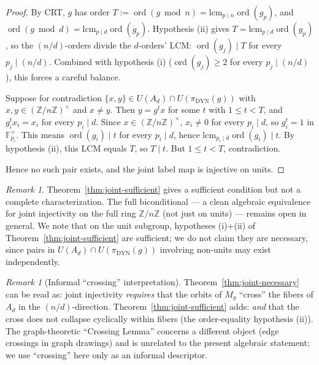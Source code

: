 \documentclass[11pt,reqno]{amsart}
\theoremstyle{plain}
\theoremstyle{definition}
\theoremstyle{remark}
\newtheorem{remark}[theorem]{Remark}
\DeclareMathOperator{\ord}{ord}
\DeclareMathOperator{\dyn}{DYN}
\newcommand{\Z}{\mathbb{Z}}
\newcommand{\F}{\mathbb{F}}
\begin{document}
\begin{proof}
By CRT, $g$ has order $T := \ord(g \bmod n) = \mathrm{lcm}_{p \mid n}
\ord(g_{p})$, and $\ord(g \bmod d) = \mathrm{lcm}_{p \mid d}
\ord(g_{p})$. Hypothesis (ii) gives $T = \mathrm{lcm}_{p \mid d}
\ord(g_{p})$, so the $(n/d)$-orders divide the $d$-orders' LCM:
$\ord(g_{j}) \mid T$ for every $p_{j} \mid (n/d)$. Combined with
hypothesis (i) ($\ord(g_{j}) \ge 2$ for every $p_{j} \mid (n/d)$),
this forces a careful balance.

Suppose for contradiction $\{x, y\} \in U(A_{d}) \cap U(\pi_{\dyn}(g))$
with $x, y \in (\Z/n\Z)^{\times}$ and $x \ne y$. Then $y = g^{t} x$
for some $t$ with $1 \le t < T$, and $g_{i}^{t} x_{i} = x_{i}$ for
every $p_{i} \mid d$. Since $x \in (\Z/n\Z)^{\times}$, $x_{i} \ne 0$
for every $p_{i} \mid d$, so $g_{i}^{t} = 1$ in $\F_{p_{i}}^{\times}$.
This means $\ord(g_{i}) \mid t$ for every $p_{i} \mid d$, hence
$\mathrm{lcm}_{p_{i} \mid d} \ord(g_{i}) \mid t$. By hypothesis (ii),
this LCM equals $T$, so $T \mid t$. But $1 \le t < T$, contradiction.

Hence no such pair exists, and the joint label map is injective on
units.
\end{proof}

\begin{remark}\label{rem:sufficient-not-equiv}
Theorem~\ref{thm:joint-sufficient} gives a sufficient condition but
not a complete characterization. The full biconditional --- a clean
algebraic equivalence for joint injectivity on the full ring
$\Z/n\Z$ (not just on units) --- remains open in general. We note
that on the unit subgroup, hypotheses (i)+(ii) of
Theorem~\ref{thm:joint-sufficient} are sufficient; we do not claim
they are necessary, since pairs in $U(A_{d}) \cap U(\pi_{\dyn}(g))$
involving non-units may exist independently.
\end{remark}

\begin{remark}[Informal ``crossing'' interpretation]\label{rem:crossing-informal}
Theorem~\ref{thm:joint-necessary} can be read as: joint injectivity
\emph{requires} that the orbits of $M_{g}$ ``cross'' the fibers of
$A_{d}$ in the $(n/d)$-direction. Theorem~\ref{thm:joint-sufficient}
adds: \emph{and} that the cross does not collapse cyclically within
fibers (the order-equality hypothesis (ii)). The graph-theoretic
``Crossing Lemma'' \cite{ACNS1982} concerns a different object (edge
crossings in graph drawings) and is unrelated to the present
algebraic statement; we use ``crossing'' here only as an informal
descriptor.
\end{remark}
\end{document}
